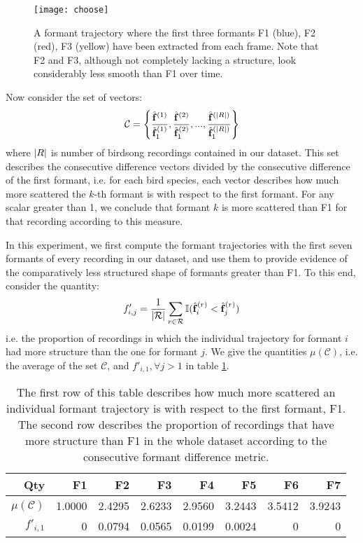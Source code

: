 \documentclass[../main.tex]{subfiles}
\begin{document}
\begin{figure}[ht]
\centering
\texttt{[image: choose]}
\caption{A formant trajectory where the first three formants F1 (blue), F2 (red), F3 (yellow) have been extracted from each frame. Note that F2 and F3, although not completely lacking a structure, look considerably less smooth than F1 over time.}
\label{fig_choose}
\end{figure}
\par Now consider the set of vectors:
\begin{align*}
\mathcal{C} = \left\{\frac{\hat{\mathbf{f}}^{(1)}}{\hat{\mathbf{f}}^{(1)}_1}, \frac{\hat{\mathbf{f}}^{(2)}}{\hat{\mathbf{f}}^{(2)}_1}, ..., \frac{\hat{\mathbf{f}}^{(\lvert R\rvert)}}{\hat{\mathbf{f}}^{(\lvert R\rvert)}_1}\right\}
\end{align*}
where $\lvert R\rvert$ is number of birdsong recordings contained in our dataset. This set describes the consecutive difference vectors divided by the consecutive difference of the first formant, i.e. for each bird species, each vector describes how much more scattered the $k$-th formant is with respect to the first formant. For any scalar greater than 1, we conclude that formant $k$ is more scattered than F1 for that recording according to this measure. 
\par In this experiment, we first compute the formant trajectories with the first seven formants of every recording in our dataset, and use them to provide evidence of the comparatively less structured shape of formants greater than F1. To this end, consider the quantity:
\begin{align*}
f'_{i, j} = \frac{1}{\lvert\mathcal{R}\rvert}\sum_{r \in \mathcal{R}} \mathbb{I}(\hat{\mathbf{f}}^{(r)}_i < \hat{\mathbf{f}}^{(r)}_j)
\end{align*}
i.e. the proportion of recordings in which the individual trajectory for formant $i$ had more structure than the one for formant $j$. We give the quantities $\mu(\mathcal{C})$, i.e. the average of the set $\mathcal{C}$, and $f'_{i, 1}, \forall j > 1$ in table  \ref{table_choose}.
\begin{table}[ht]
\centering
\begin{tabular}{r|r|r|r|r|r|r|r} 
 \textbf{Qty} &\textbf{F1} &  \textbf{F2}&  \textbf{F3}&  \textbf{F4}&  \textbf{F5}&  \textbf{F6}&  \textbf{F7}\\
 \hline
 $\mu(\mathcal{C})$ & 1.0000  &  2.4295  &  2.6233  &  2.9560  &  3.2443  &  3.5412  &  3.9243 \\
 $f'_{i, 1}$ & 0 & 0.0794 & 0.0565 & 0.0199 & 0.0024 & 0 & 0
\end{tabular}
\caption{The first row of this table describes how much more scattered an individual formant trajectory is with respect to the first formant, F1. The second row describes the proportion of recordings that have more structure than F1 in the whole dataset according to the consecutive formant difference metric.}\label{table_choose}
\end{table}
\end{document}
